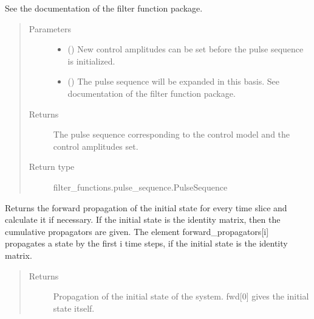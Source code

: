 \documentclass[letterpaper,10pt,english]{sphinxmanual}
\begin{document}
\begin{fulllineitems}
\begin{fulllineitems}
See the documentation of the filter function package.
\begin{quote}\begin{description}
\item[{Parameters}] \leavevmode\begin{itemize}
\item {} 
 (\sphinxstyleliteralemphasis{\sphinxupquote{, }}\sphinxstyleliteralemphasis{\sphinxupquote{ (}}\sphinxstyleliteralemphasis{\sphinxupquote{, }}\sphinxstyleliteralemphasis{\sphinxupquote{)}}) \textendash{} New control amplitudes can be set before the pulse sequence is
initialized.

\item {} 
 () \textendash{} The pulse sequence will be expanded in this basis. See
documentation of the filter function package.

\end{itemize}

\item[{Returns}] \leavevmode
{} \textendash{} The pulse sequence corresponding to the control model and the
control amplitudes set.

\item[{Return type}] \leavevmode
filter\_functions.pulse\_sequence.PulseSequence

\end{description}\end{quote}

\end{fulllineitems}


\begin{fulllineitems}
\label{\detokenize{qsim:qsim.solver_algorithms.Solver.forward_propagators}}
Returns the forward propagation of the initial state for every time
slice and calculate it if necessary. If the initial state is the
identity matrix, then the cumulative propagators are given. The element
forward\_propagators{[}i{]} propagates a state by the first i time steps, if
the initial state is the identity matrix.
\begin{quote}\begin{description}
\item[{Returns}] \leavevmode
{} \textendash{} Propagation of the initial state of the system. fwd{[}0{]} gives the
initial state itself.


\end{description}
\end{quote}
\end{fulllineitems}
\end{fulllineitems}
\end{document}
